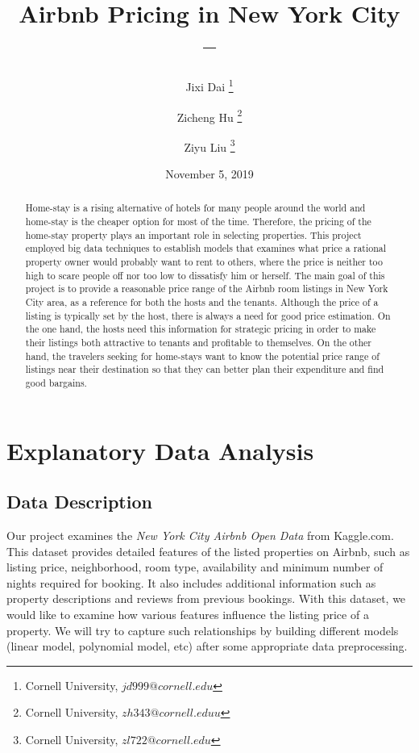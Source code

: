 \documentclass[twocolumn]{article}
\title{Airbnb Pricing in New York City \\ -- }
\author{Jixi Dai \footnote{Cornell University, $jd999@cornell.edu$} \and Zicheng Hu \footnote{Cornell University, $zh343@cornell.eduu$} \and Ziyu Liu \footnote{Cornell University, $zl722@cornell.edu$}}
\date{November 5, 2019}
\begin{document}
\begin{titlepage}
\maketitle
\thispagestyle{empty}
\bigskip
\begin{abstract}
Home-stay is a rising alternative of hotels for many people around the world and home-stay is the cheaper
option for most of the time. Therefore, the pricing of the home-stay property plays an important role in
selecting properties. This project employed big data techniques to establish models that examines what price a rational property owner would probably want to rent to others, where the price is neither too high to scare people off nor too low to dissatisfy him or herself. The main goal of this project is to provide a reasonable price range of the Airbnb room listings in New
York City area, as a reference for both the hosts and the tenants. Although the price of a listing is typically set by the host, there is always a need for good price estimation. On the one hand, the hosts need this
information for strategic pricing in order to make their listings both attractive to tenants and profitable to
themselves. On the other hand, the travelers seeking for home-stays want to know the potential price range of listings near their destination so that they can better plan their expenditure and find good bargains.


\end{abstract}
\clearpage
{}
\tableofcontents
\end{titlepage}



\section{Explanatory Data Analysis}

\subsection{Data Description}
Our project examines the \textit{New York City Airbnb Open Data} from Kaggle.com. This dataset provides detailed
features of the listed properties on Airbnb, such as listing price, neighborhood, room type, availability and
minimum number of nights required for booking. It also includes additional information such as property
descriptions and reviews from previous bookings. With this dataset, we would like to examine how various
 features influence the listing price of a property. We will try to capture such relationships by building
different models (linear model, polynomial model, etc) after some appropriate data preprocessing.
\end{document}
